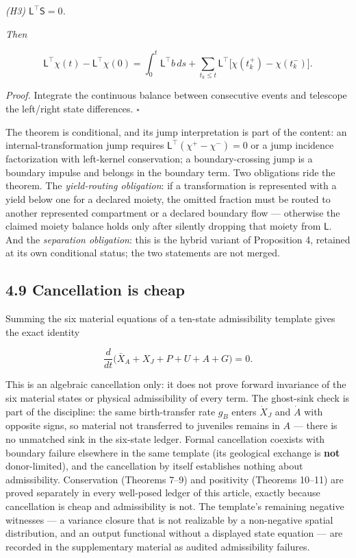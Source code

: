 \documentclass[11pt]{article}
\begin{document}
\emph{(H3) \(\mathsf{L}^\top \mathsf{S} =\allowbreak{} 0\).}

\emph{Then} 

$$\mathsf{L}^\top \chi(t) - \mathsf{L}^\top \chi(0) = \int_0^t \mathsf{L}^\top b\, ds + \sum_{t_k \le t} \mathsf{L}^\top \bigl[ \chi(t_k^+) - \chi(t_k^-) \bigr].$$



\emph{Proof.} Integrate the continuous balance between consecutive events and telescope the left/\allowbreak{}right state differences. \(\square\)

The theorem is conditional, and its jump interpretation is part of the content: an internal-transformation jump requires \(\mathsf{L}^\top(\chi^+\allowbreak{} - \chi^-) =\allowbreak{} 0\) or a jump incidence factorization with left-kernel conservation; a boundary-crossing jump is a boundary impulse and belongs in the boundary term. Two obligations ride the theorem. The \emph{yield-routing obligation}: if a transformation is represented with a yield below one for a declared moiety, the omitted fraction must be routed to another represented compartment or a declared boundary flow --- otherwise the claimed moiety balance holds only after silently dropping that moiety from \(\mathsf{L}\). And the \emph{separation obligation}: this is the hybrid variant of Proposition 4, retained at its own conditional status; the two statements are not merged.

\subsection*{4.9 Cancellation is cheap}\label{49-cancellation-is-cheap}

Summing the six material equations of a ten-state admissibility template gives the exact identity 

$$\frac{d}{dt}\bigl( \bar X_A + X_J + P + U + A + G \bigr) = 0.$$

 This is an algebraic cancellation only: it does not prove forward invariance of the six material states or physical admissibility of every term. The ghost-sink check is part of the discipline: the same birth-transfer rate \(g_B\) enters \(\dot X_J\) and \(\dot A\) with opposite signs, so material not transferred to juveniles remains in \(A\) --- there is no unmatched sink in the six-state ledger. Formal cancellation coexists with boundary failure elsewhere in the same template (its geological exchange is \textbf{not} donor-limited), and the cancellation by itself establishes nothing about admissibility. Conservation (Theorems 7--9) and positivity (Theorems 10--11) are proved separately in every well-posed ledger of this article, exactly because cancellation is cheap and admissibility is not. The template's remaining negative witnesses --- a variance closure that is not realizable by a non-negative spatial distribution, and an output functional without a displayed state equation --- are recorded in the supplementary material as audited admissibility failures.
\end{document}
